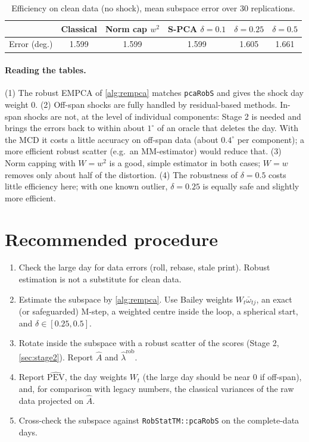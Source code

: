 \documentclass[11pt]{article}
\theoremstyle{definition}
\theoremstyle{remark}
\begin{document}
\begin{table}[ht]\centering
\caption{Efficiency on clean data (no shock), mean subspace error over 30 replications.}\label{tab:eff}
\begin{tabular}{lccccc}\toprule
& Classical & Norm cap $w^2$ & S-PCA $\delta=0.1$ & $\delta=0.25$ & $\delta=0.5$\\\midrule
Error (deg.) & 1.599 & 1.599 & 1.599 & 1.605 & 1.661\\\bottomrule
\end{tabular}
\end{table}

\paragraph{Reading the tables.}
(1) The robust EMPCA of \cref{alg:rempca} matches \texttt{pcaRobS} and gives the shock day weight $0$.
(2) Off-span shocks are fully handled by residual-based methods. In-span shocks are not, at the level of individual
components: Stage 2 is needed and brings the errors back to within about $1^\circ$ of an oracle that deletes the day. With the MCD it
costs a little accuracy on off-span data (about $0.4^\circ$ per component); a more efficient robust scatter (e.g.\ an
MM-estimator) would reduce that.
(3) Norm capping with $W=w^2$ is a good, simple estimator in both cases; $W=w$ removes only about half of the
distortion. (4) The robustness of $\delta=0.5$ costs little efficiency here; with one known outlier, $\delta=0.25$ is
equally safe and slightly more efficient.

\section{Recommended procedure}\label{sec:recipe}
\begin{enumerate}
\item Check the large day for data errors (roll, rebase, stale print). Robust estimation is not a substitute for clean data.
\item Estimate the subspace by \cref{alg:rempca}. Use Bailey weights $W_t\bar\omega_{tj}$, an exact (or safeguarded)
M-step, a weighted centre inside the loop, a spherical start, and $\delta\in[0.25,0.5]$.
\item Rotate inside the subspace with a robust scatter of the scores (Stage 2, \cref{sec:stage2}). Report $\hat A$ and
$\hat\lambda^{\mathrm{rob}}$.
\item Report $\widehat{\mathrm{PEV}}$, the day weights $W_t$ (the large day should be near 0 if off-span), and, for comparison
with legacy numbers, the classical variances of the raw data projected on $\hat A$.
\item Cross-check the subspace against \texttt{RobStatTM::pcaRobS} on the complete-data days.
\end{enumerate}
\end{document}
